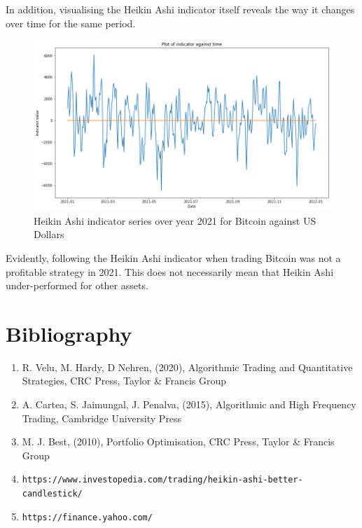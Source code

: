\documentclass[11pt]{article}
\begin{document}
\newpage

In addition, visualising the Heikin Ashi indicator itself reveals the way it changes over time for the same period.

\begin{figure}[H]
\centering
    \includegraphics[width=1\linewidth]{images/indicator_graph.png}
    \caption{Heikin Ashi indicator series over year 2021 for Bitcoin against US Dollars}
\end{figure}

Evidently, following the Heikin Ashi indicator when trading Bitcoin was not a profitable strategy in 2021. This does not necessarily mean that Heikin Ashi under-performed for other assets.

\section{Bibliography}
\begin{enumerate}
    \item R. Velu, M. Hardy, D Nehren, (2020), Algorithmic Trading and Quantitative Strategies, CRC Press, Taylor \& Francis Group
    \item A. Cartea, S. Jaimungal, J. Penalva, (2015), Algorithmic and High Frequency Trading, Cambridge University Press
    \item M. J. Best, (2010), Portfolio Optimisation, CRC Press, Taylor \& Francis Group
    \item \texttt{https://www.investopedia.com/trading/heikin-ashi-better-candlestick/}
    \item \texttt{https://finance.yahoo.com/}
\end{enumerate}
\end{document}
